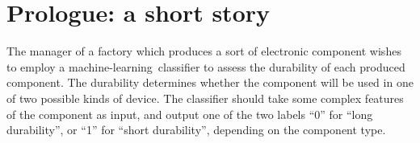 \documentclass[\ifafour a4paper,12pt,\else a5paper,10pt,\fi%
onecolumn,oneside,article,%
british%
]{memoir}
\theoremstyle{remark}
\theoremstyle{innote}
\newcommand*{\asudedication}[1]{%
{\par\centering\textit{#1}\par}}
\renewcommand*{\|}[1][]{\nonscript\:#1\vert\nonscript\:\mathopen{}}
\newcommand*{\ml}{machine-learning}
\begin{document}




\setcounter{section}{-1}

\section{Prologue: a short story}
\label{sec:intro}

The manager of a factory which produces a sort of electronic component wishes to employ a \ml\ classifier to assess the durability of each produced component. The durability determines whether the component will be used in one of two possible kinds of device. The classifier should take some complex features of the component as input, and output one of the two labels \enquote{0} for \enquote{long durability}, or \enquote{1} for \enquote{short durability}, depending on the component type.
\end{document}

